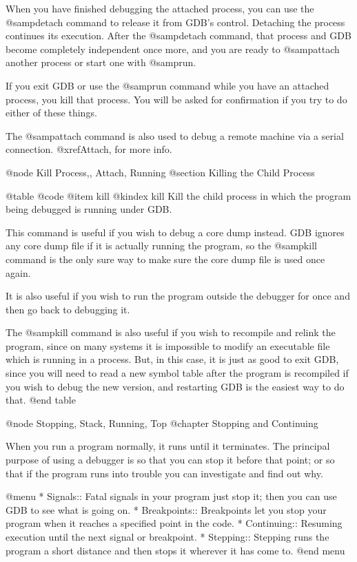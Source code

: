 When you have finished debugging the attached process, you can use the
@samp{detach} command to release it from GDB's control.  Detaching
the process continues its execution.  After the @samp{detach} command,
that process and GDB become completely independent once more, and you
are ready to @samp{attach} another process or start one with @samp{run}.

If you exit GDB or use the @samp{run} command while you have an attached
process, you kill that process.  You will be asked for confirmation if you
try to do either of these things.

The @samp{attach} command is also used to debug a remote machine via a
serial connection.  @xref{Attach}, for more info.

@node Kill Process,, Attach, Running
@section Killing the Child Process

@table @code
@item kill
@kindex kill
Kill the child process in which the program being debugged is running
under GDB.

This command is useful if you wish to debug a core dump instead.  GDB
ignores any core dump file if it is actually running the program, so the
@samp{kill} command is the only sure way to make sure the core dump file
is used once again.

It is also useful if you wish to run the program outside the debugger
for once and then go back to debugging it.

The @samp{kill} command is also useful if you wish to recompile and
relink the program, since on many systems it is impossible to modify an
executable file which is running in a process.  But, in this case, it is
just as good to exit GDB, since you will need to read a new symbol table
after the program is recompiled if you wish to debug the new version,
and restarting GDB is the easiest way to do that.
@end table

@node Stopping, Stack, Running, Top
@chapter Stopping and Continuing

When you run a program normally, it runs until it terminates.  The
principal purpose of using a debugger is so that you can stop it before
that point; or so that if the program runs into trouble you can
investigate and find out why.

@menu
* Signals::      Fatal signals in your program just stop it;
                 then you can use GDB to see what is going on.
* Breakpoints::  Breakpoints let you stop your program when it
                 reaches a specified point in the code.
* Continuing::   Resuming execution until the next signal or breakpoint.
* Stepping::     Stepping runs the program a short distance and
                 then stops it wherever it has come to.
@end menu

